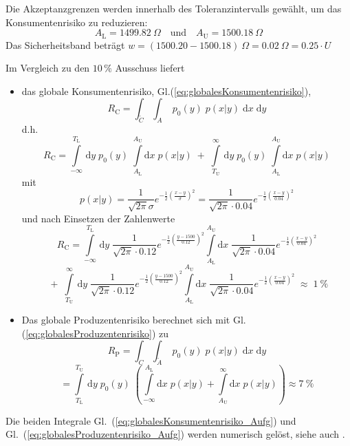 Die Akzeptanzgrenzen werden innerhalb des Toleranzintervalls gewählt, um das
Konsumentenrisiko zu reduzieren:
\[
A_\mathrm{L} = 1499.82~\Omega \quad \textrm{und} \quad A_\mathrm{U} = 1500.18~\Omega
\]
Das Sicherheitsband beträgt $w = (1500.20-1500.18)~\Omega = 0.02~\Omega = 0.25\cdot U$

Im Vergleich zu den $10 \, \%$ Ausschuss liefert
\begin{itemize}
\item das globale Konsumentenrisiko, Gl.(\ref{eq:globalesKonsumentenrisiko}),
\begin{equation}
	R_\mathrm{C} =  \int_{\tilde C} \int_{A} \; p_0(y) \; p(x|y) \;\mathrm{d}x\; \mathrm{d}y
	\label{eq:globalesKonsumentenrisiko_Aufg}
\end{equation}
d.h.
$$
R_\mathrm{C} =  \int\limits_{-\infty}^{T_\mathrm{L}} \, \mathrm{d}y\; p_0(y) \;
 \int\limits_{A_\mathrm{L}}^{A_\mathrm{U}} \mathrm{d}x \; p(x|y) \; + \;
 \int\limits_{T_\mathrm{U}}^{\infty} \, \mathrm{d}y\; p_0(y) \;
  \int\limits_{A_\mathrm{L}}^{A_\mathrm{U}} \mathrm{d}x \; p(x|y)
$$
mit
\begin{equation}
	p(x|y) =\frac{1}{\sqrt{2 \pi} \sigma}
	e^{-\frac{1}{2}\left(\frac{x - y}{\sigma}\right)^2} =
	\frac{1}{\sqrt{2 \pi} \cdot 0.04}
		e^{-\frac{1}{2}\left(\frac{x - y}{0.04}\right)^2}
\end{equation}
und nach Einsetzen der Zahlenwerte
$$
 R_\mathrm{C} = \int\limits_{-\infty}^{T_\mathrm{L}} \, \mathrm{d}y\;
 \frac{1}{\sqrt{2 \pi} \cdot 0.12}
 e^{-\frac{1}{2}\left(\frac{y - 1500}{0.12}\right)^2}
 \int\limits_{A_\mathrm{L}}^{A_\mathrm{U}} \mathrm{d}x \;
 \frac{1}{\sqrt{2 \pi} \cdot 0.04}
   e^{-\frac{1}{2}\left(\frac{x - y}{0.04}\right)^2}
$$
$$
   \; + \;
   \int\limits_{T_\mathrm{U}}^{\infty} \, \mathrm{d}y\;
  \frac{1}{\sqrt{2 \pi} \cdot 0.12}
  e^{-\frac{1}{2}\left(\frac{y - 1500}{0.12}\right)^2}
  \int\limits_{A_\mathrm{L}}^{A_\mathrm{U}} \mathrm{d}x \;
  \frac{1}{\sqrt{2 \pi} \cdot 0.04}
    e^{-\frac{1}{2}\left(\frac{x - y}{0.04}\right)^2}
  \; \approx \; 1~\%
$$
\item Das globale Produzentenrisiko berechnet sich mit Gl.(\ref{eq:globalesProduzentenrisiko}) zu
\begin{equation}
	R_\mathrm{P} =  \int_{C} \int_{\tilde A} \; p_0(y) \; p(x|y) \; \mathrm{d}x\; \mathrm{d}y
  \label{eq:globalesProduzentenrisiko_Aufg}
\end{equation}
$$
	=  \int\limits_{T_\mathrm{L}}^{T_\mathrm{U}} \, \mathrm{d}y\; p_0(y) \;
 \left(\int\limits_{-\infty}^{A_\mathrm{L}} \mathrm{d}x \; p(x|y)
 + \int\limits_{A_\mathrm{U}}^{\infty} \mathrm{d}x \; p(x|y) \right)  \approx 7~\%
$$
\end{itemize}
Die beiden Integrale Gl.~(\ref{eq:globalesKonsumentenrisiko_Aufg})
und Gl.~(\ref{eq:globalesProduzentenrisiko_Aufg}) werden numerisch gelöst,
siehe auch \cite{JCGM106}.

